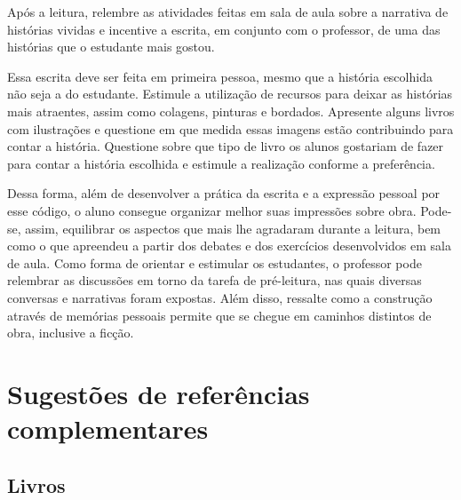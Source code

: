 \documentclass[11pt]{extarticle}
\begin{document}
Após a leitura, relembre as atividades feitas em sala de aula sobre a narrativa de histórias vividas e incentive a escrita, em conjunto com o professor, de uma das histórias que o estudante mais gostou. 

Essa escrita deve ser feita em primeira pessoa, mesmo que a história escolhida não seja a do estudante. Estimule a utilização de recursos para deixar as histórias mais atraentes, assim como colagens, pinturas e bordados. Apresente alguns livros com ilustrações e questione em que medida essas imagens estão contribuindo para contar a história. Questione sobre que tipo de livro os alunos gostariam de fazer para contar a história escolhida e estimule a realização conforme a preferência. 


Dessa forma, além de desenvolver a prática da escrita e a expressão pessoal por esse código, o aluno consegue organizar melhor suas impressões sobre obra. Pode-se, assim, equilibrar os aspectos que mais lhe agradaram durante a leitura, bem como o que apreendeu a partir dos debates e dos exercícios desenvolvidos em sala de aula. Como forma de orientar e estimular os estudantes, o professor pode relembrar as discussões em torno da tarefa de pré-leitura, nas quais diversas conversas e narrativas foram expostas. Além disso, ressalte como a construção através de memórias pessoais permite que se chegue em caminhos distintos de obra, inclusive a ficção. 


\section{Sugestões de referências complementares}

\subsection{Livros} 
\end{document}
